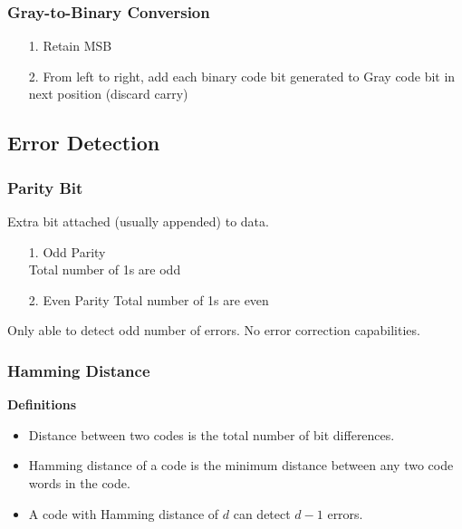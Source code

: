 \documentclass[10pt, twocolumn]{article}
\begin{document}
\subsubsection{Gray-to-Binary Conversion}
\begin{enumerate}
\item[1.]{Retain MSB}
\item[2.]{From left to right, add each binary code bit generated to Gray code bit in next position (discard carry)}
\end{enumerate}

\subsection{Error Detection}
\subsubsection{Parity Bit}
Extra bit attached (usually appended) to data.
\begin{enumerate}
\item[1.]{Odd Parity} \\
Total number of 1s are odd
\item[2.]{Even Parity}
Total number of 1s are even
\end{enumerate}
Only able to detect odd number of errors. No error correction capabilities.
\subsubsection{Hamming Distance}
{\bf Definitions}
\begin{itemize}
\item Distance between two codes is the total number of bit differences.
\item Hamming distance of a code is the minimum distance between any two code words in the code.
\item A code with Hamming distance of $d$ can detect $d-1$ errors.
\end{itemize}
\end{document}
